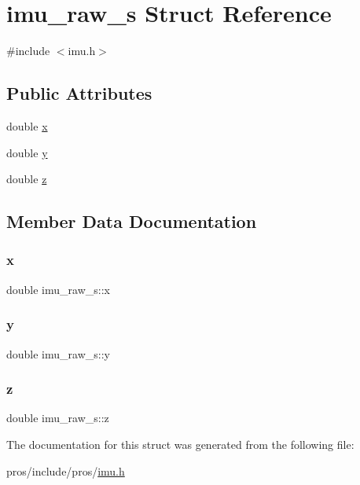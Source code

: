 \hypertarget{structimu__raw__s}{}\section{imu\+\_\+raw\+\_\+s Struct Reference}
\label{structimu__raw__s}


{\ttfamily \#include $<$imu.\+h$>$}

\subsection*{Public Attributes}
\begin{DoxyCompactItemize}
\item 
double \hyperlink{structimu__raw__s_ae89e3c1589ae0fe0f58e881b5b5abe0d}{x}
\item 
double \hyperlink{structimu__raw__s_a22be518c9f5925fdde807811013fa778}{y}
\item 
double \hyperlink{structimu__raw__s_a939f61108459fad036af0fada56daa3e}{z}
\end{DoxyCompactItemize}


\subsection{Member Data Documentation}
\mbox{\label{structimu__raw__s_ae89e3c1589ae0fe0f58e881b5b5abe0d}} 
\subsubsection{\texorpdfstring{x}{x}}
{\footnotesize\ttfamily double imu\+\_\+raw\+\_\+s\+::x}

\mbox{\label{structimu__raw__s_a22be518c9f5925fdde807811013fa778}} 
\subsubsection{\texorpdfstring{y}{y}}
{\footnotesize\ttfamily double imu\+\_\+raw\+\_\+s\+::y}

\mbox{\label{structimu__raw__s_a939f61108459fad036af0fada56daa3e}} 
\subsubsection{\texorpdfstring{z}{z}}
{\footnotesize\ttfamily double imu\+\_\+raw\+\_\+s\+::z}



The documentation for this struct was generated from the following file\+:\begin{DoxyCompactItemize}
\item 
pros/include/pros/\hyperlink{imu_8h}{imu.\+h}\end{DoxyCompactItemize}
